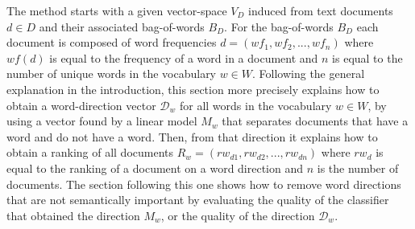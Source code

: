  The method starts with a given vector-space $V_D$ induced from text documents $d \in D$ and their associated bag-of-words $B_D$. For the bag-of-words $B_D$ each document is composed of word frequencies $d = ({wf}_1, {wf}_2, ..., {wf}_n)$ where ${wf}(d)$ is equal to the frequency of a word in a document and $n$ is equal to the number of unique words  in the vocabulary $w \in W$.
  Following the general explanation in the introduction, this section more precisely explains how to obtain a word-direction vector $\mathcal{D}_w$ for all words in the vocabulary $w \in W$, by using a vector found by a linear model $M_w$ that separates documents that have a word and do not have a word. Then, from that direction it explains  how to obtain a ranking of all documents $R_w = ({rw}_{d1}, {rw}_{d2}, ..., {rw}_{dn})$ where ${rw}_{d}$ is equal to the ranking of a document on a word direction and $n$ is the number of documents. The section following this one shows how to remove word directions that are not semantically important by evaluating the quality of the classifier that obtained the direction $M_w$, or the quality of the direction $\mathcal{D}_w$.
 




